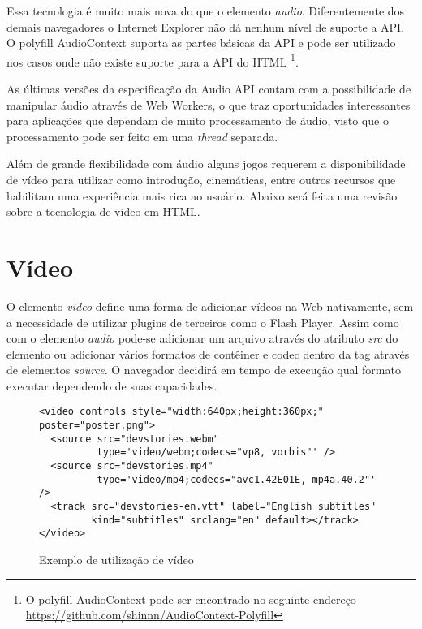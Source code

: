 Essa tecnologia é muito mais nova do que o elemento \textit{audio}.
Diferentemente dos demais navegadores o Internet Explorer não
dá nenhum nível de suporte a API. O polyfill AudioContext
suporta as partes básicas da API e pode ser utilizado nos
casos onde não existe suporte para a API do HTML \footnote{O
polyfill AudioContext pode ser encontrado no seguinte endereço
\url{https://github.com/shinnn/AudioContext-Polyfill}}.

As últimas versões da especificação da Audio API contam com a
possibilidade de manipular áudio através de Web Workers, o
que traz oportunidades interessantes para aplicações que dependam de
muito processamento de áudio, visto que o processamento pode ser
feito em uma \textit{thread} separada.

Além de grande flexibilidade com áudio alguns jogos requerem a
disponibilidade de vídeo para utilizar como introdução, cinemáticas,
entre outros recursos que habilitam uma experiência mais rica ao
usuário. Abaixo será feita uma revisão sobre a tecnologia de vídeo
em HTML.

\section{Vídeo}

O elemento \textit{video} define uma forma de adicionar vídeos na
Web nativamente, sem a necessidade de utilizar plugins de terceiros
como o Flash Player. Assim como com o elemento \textit{audio} pode-se
adicionar um arquivo através do atributo \textit{src} do elemento
ou adicionar vários formatos de contêiner e codec dentro da tag
através de elementos \textit{source}. O navegador decidirá em tempo de
execução qual formato executar dependendo de suas capacidades.

\begin{figure}[H]
\centering
\begin{verbatim}
<video controls style="width:640px;height:360px;" poster="poster.png">
  <source src="devstories.webm" 
          type='video/webm;codecs="vp8, vorbis"' />
  <source src="devstories.mp4" 
          type='video/mp4;codecs="avc1.42E01E, mp4a.40.2"' />
  <track src="devstories-en.vtt" label="English subtitles" 
         kind="subtitles" srclang="en" default></track>
</video>
\end{verbatim}
\caption{Exemplo de utilização de vídeo}
\label{fig:video}
\end{figure}


